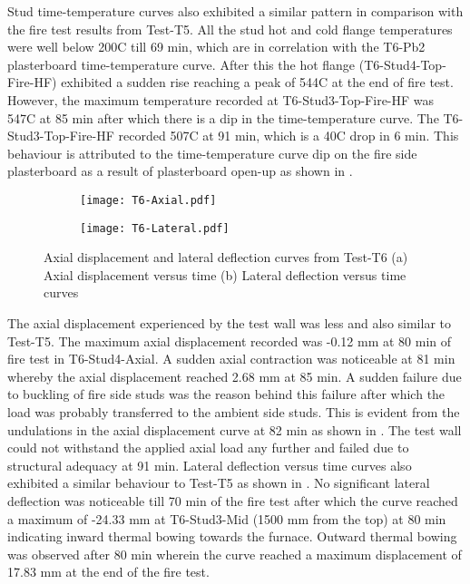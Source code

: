 Stud time-temperature curves also exhibited a similar pattern in comparison with the fire test results from Test-T5. All the stud hot and cold flange temperatures were well below 200\degree C till 69 min, which are in correlation with the T6-Pb2 plasterboard time-temperature curve. After this the hot flange (T6-Stud4-Top-Fire-HF) exhibited a sudden rise reaching a peak of 544\degree C at the end of fire test. However, the maximum temperature recorded at T6-Stud3-Top-Fire-HF was 547\degree C at 85 min after which there is a dip in the time-temperature curve. The T6-Stud3-Top-Fire-HF recorded 507\degree C at 91 min, which is a 40\degree C drop in 6 min. This behaviour is attributed to the time-temperature curve dip on the fire side plasterboard as a result of plasterboard open-up as shown in . 
\begin{figure}[!htbp]
	\centering
	\begin{subfigure}[b]{0.7\textwidth}
		\centering
		\texttt{[image: T6-Axial.pdf]}
		\caption{}
		\label{subfig:T6-Axial}
	\end{subfigure}
	\begin{subfigure}[b]{0.7\textwidth}
		\centering
		\texttt{[image: T6-Lateral.pdf]}
		\caption{}
		\label{subfig:T6-Lateral}
	\end{subfigure}
	   \caption{Axial displacement and lateral deflection curves from Test-T6 (a) Axial displacement versus time (b) Lateral deflection versus time curves}
	   \label{fig:T6-Axial-Lateral}
\end{figure}

The axial displacement experienced by the test wall was less and also similar to Test-T5. The maximum axial displacement recorded was -0.12 mm at 80 min of fire test in T6-Stud4-Axial. A sudden axial contraction was noticeable at 81 min whereby the axial displacement reached 2.68 mm at 85 min. A sudden failure due to buckling of fire side studs was the reason behind this failure after which the load was probably transferred to the ambient side studs. This is evident from the undulations in the axial displacement curve at 82 min as shown in . The test wall could not withstand the applied axial load any further and failed due to structural adequacy at 91 min. Lateral deflection versus time curves also exhibited a similar behaviour to Test-T5 as shown in . No significant lateral deflection was noticeable till 70 min of the fire test after which the curve reached a maximum of -24.33 mm at T6-Stud3-Mid (1500 mm from the top) at 80 min indicating inward thermal bowing towards the furnace. Outward thermal bowing was observed after 80 min wherein the curve reached a maximum displacement of 17.83 mm at the end of the fire test.

